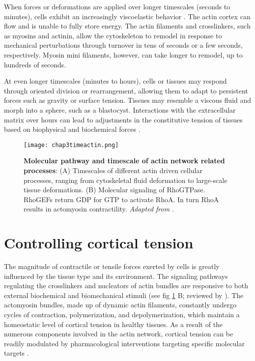 When forces or deformations are applied over longer timescales (seconds to minutes), cells exhibit an increasingly viscoelastic behavior \cite{kollmannsberger2011}. The actin cortex can flow and is unable to fully store energy. The actin filaments and crosslinkers, such as myosins and actinin, allow the cytoskeleton to remodel in response to mechanical perturbations through turnover in tens of seconds or a few seconds, respectively. Myosin mini filaments, however, can take longer to remodel, up to hundreds of seconds.

At even longer timescales (minutes to hours), cells or tissues may respond through oriented division or rearrangement, allowing them to adapt to persistent forces such as gravity or surface tension. Tissues may resemble a viscous fluid and morph into a sphere, such as a blastocyst. Interactions with the extracellular matrix over hours can lead to adjustments in the constitutive tension of tissues based on biophysical and biochemical forces \cite{porazinski2015}.

\begin{figure}
	\centering
	\texttt{[image: chap3timeactin.png]}
	\caption{\label{fig_3_5} \textbf{Molecular pathway and timescale of actin network related processes}: (A) Timescales of different actin driven cellular processes, ranging from cytoskeletal fluid deformation to large-scale tissue deformations. (B) Molecular signaling of RhoGTPase. RhoGEFs return GDP for GTP to activate RhoA. In turn RhoA results in actomyosin contractility. \textit{Adapted from \cite{kelkar2020, wyatt2016}}.
	}
\end{figure}

\hypertarget{controlling-cortical-tension}{%
	\section{Controlling cortical
		tension}\label{controlling-cortical-tension}}

The magnitude of contractile or tensile forces exerted by cells is greatly influenced by the tissue type and its environment. The signaling pathways regulating the crosslinkers and nucleators of actin bundles are responsive to both external biochemical and biomechanical stimuli (see fig \ref{fig_3_5} B; reviewed by \cite{kelkar2020}). The actomyosin bundles, made up of dynamic actin filaments, constantly undergo cycles of contraction, polymerization, and depolymerization, which maintain a homeostatic level of cortical tension in healthy tissues. As a result of the numerous components involved in the actin network, cortical tension can be readily modulated by pharmacological interventions targeting specific molecular targets \cite{cartagena-rivera2016}.

